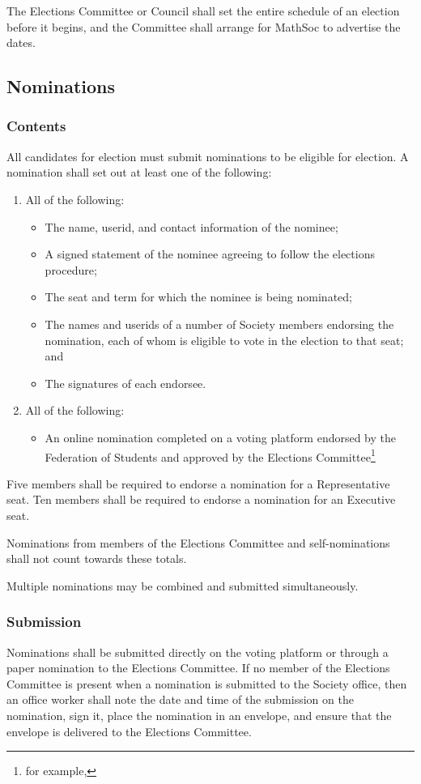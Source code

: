 The Elections Committee or Council shall set the entire schedule of an election before it begins, and the Committee shall arrange for MathSoc to advertise the dates.

\subsection{Nominations}
\subsubsection{Contents}
All candidates for election must submit nominations to be eligible for election.
A nomination shall set out at least one of the following:
\begin{enumerate}
	\item All of the following:
		\begin{itemize}
			\item The name, userid, and contact information of the nominee;
			\item A signed statement of the nominee agreeing to follow the elections
				procedure;
			\item The seat and term for which the nominee is being nominated;
			\item The names and userids of a number of Society members endorsing the
				nomination, each of whom is eligible to vote in the election to that seat; and
			\item The signatures of each endorsee.
		\end{itemize}
	\item All of the following:
		\begin{itemize}
			\item An online nomination completed on a voting platform endorsed by the Federation of Students and approved by the Elections Committee\footnote{for example, \votewebsite}
		\end{itemize}
\end{enumerate}
Five members shall be required to endorse a nomination for a Representative seat.
Ten members shall be required to endorse a nomination for an Executive seat.

Nominations from members of the Elections Committee and self-nominations shall not count towards these totals.

Multiple nominations may be combined and submitted simultaneously.

\subsubsection{Submission}
Nominations shall be submitted directly on the voting platform or through a paper nomination to the Elections Committee.
If no member of the Elections Committee is present when a nomination is submitted to the Society office, then an office worker shall note the date and time of the submission on the nomination, sign it, place the nomination in an envelope, and ensure that the envelope is delivered to the Elections Committee.

